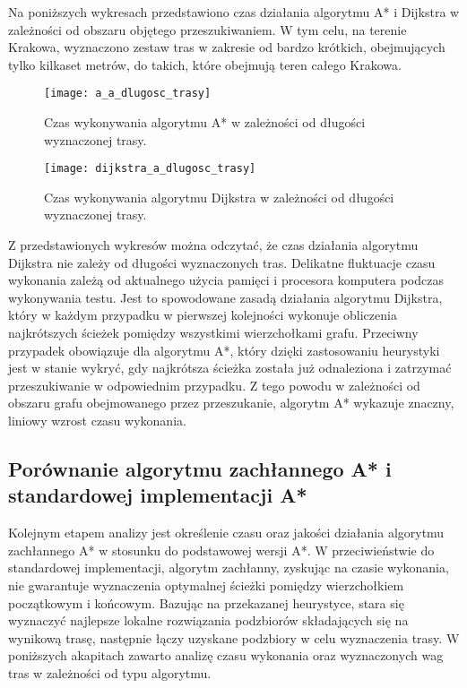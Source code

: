 Na poniższych wykresach przedstawiono czas działania algorytmu A* i Dijkstra w zależności od obszaru objętego przeszukiwaniem. W tym celu, na terenie Krakowa, wyznaczono zestaw tras w zakresie od bardzo krótkich, obejmujących tylko kilkaset metrów, do takich, które obejmują teren całego Krakowa.

\begin{figure}[H]
\centering
\texttt{[image: a\_a\_dlugosc\_trasy]}
\caption{Czas wykonywania algorytmu A* w zależności od długości wyznaczonej trasy.}
\end{figure}

\begin{figure}[H]
\centering
\texttt{[image: dijkstra\_a\_dlugosc\_trasy]}
\caption{Czas wykonywania algorytmu Dijkstra w zależności od długości wyznaczonej trasy.}
\end{figure}

Z przedstawionych wykresów można odczytać, że czas działania algorytmu Dijkstra nie zależy od długości wyznaczonych tras. Delikatne fluktuacje czasu wykonania zależą od aktualnego użycia pamięci i procesora komputera podczas wykonywania testu. Jest to spowodowane zasadą działania algorytmu Dijkstra, który w każdym przypadku w pierwszej kolejności wykonuje obliczenia najkrótszych ścieżek pomiędzy wszystkimi wierzchołkami grafu.
Przeciwny przypadek obowiązuje dla algorytmu A*, który dzięki zastosowaniu heurystyki jest w stanie wykryć, gdy najkrótsza ścieżka została już odnaleziona i zatrzymać przeszukiwanie w odpowiednim przypadku. Z tego powodu w zależności od obszaru grafu obejmowanego przez przeszukanie, algorytm A* wykazuje znaczny, liniowy wzrost czasu wykonania.

\subsection{Porównanie algorytmu zachłannego A* i standardowej implementacji A*}

Kolejnym etapem analizy jest określenie czasu oraz jakości działania algorytmu zachłannego A* w stosunku do podstawowej wersji A*. W przeciwieństwie do standardowej implementacji, algorytm zachłanny, zyskując na czasie wykonania, nie gwarantuje wyznaczenia optymalnej ścieżki pomiędzy wierzchołkiem początkowym i końcowym. Bazując na przekazanej heurystyce, stara się wyznaczyć najlepsze lokalne rozwiązania podzbiorów składających się na wynikową trasę, następnie łączy uzyskane podzbiory w celu wyznaczenia trasy. W poniższych akapitach zawarto analizę czasu wykonania oraz wyznaczonych wag tras w zależności od typu algorytmu.

